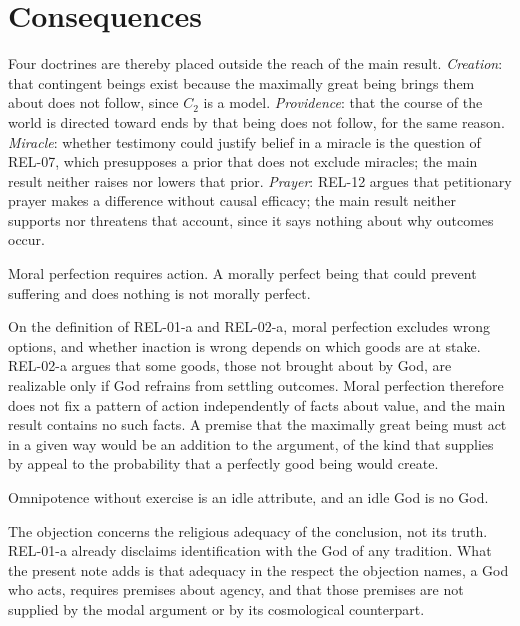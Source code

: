 \documentclass{situationist-preprint}
\begin{document}
\section{Consequences}

Four doctrines are thereby placed outside the reach of the main result. \emph{Creation}: that contingent beings exist because the maximally great being brings them about does not follow, since $C_2$ is a model. \emph{Providence}: that the course of the world is directed toward ends by that being does not follow, for the same reason. \emph{Miracle}: whether testimony could justify belief in a miracle is the question of REL-07, which presupposes a prior that does not exclude miracles; the main result neither raises nor lowers that prior. \emph{Prayer}: REL-12 argues that petitionary prayer makes a difference without causal efficacy; the main result neither supports nor threatens that account, since it says nothing about why outcomes occur.

\begin{objection}
Moral perfection requires action. A morally perfect being that could prevent suffering and does nothing is not morally perfect.
\end{objection}

\begin{reply}
On the definition of REL-01-a and REL-02-a, moral perfection excludes wrong options, and whether inaction is wrong depends on which goods are at stake. REL-02-a argues that some goods, those not brought about by God, are realizable only if God refrains from settling outcomes. Moral perfection therefore does not fix a pattern of action independently of facts about value, and the main result contains no such facts. A premise that the maximally great being must act in a given way would be an addition to the argument, of the kind that \citet{Swinburne2004} supplies by appeal to the probability that a perfectly good being would create.
\end{reply}

\begin{objection}
Omnipotence without exercise is an idle attribute, and an idle God is no God.
\end{objection}

\begin{reply}
The objection concerns the religious adequacy of the conclusion, not its truth. REL-01-a already disclaims identification with the God of any tradition. What the present note adds is that adequacy in the respect the objection names, a God who acts, requires premises about agency, and that those premises are not supplied by the modal argument or by its cosmological counterpart.
\end{reply}
\end{document}
